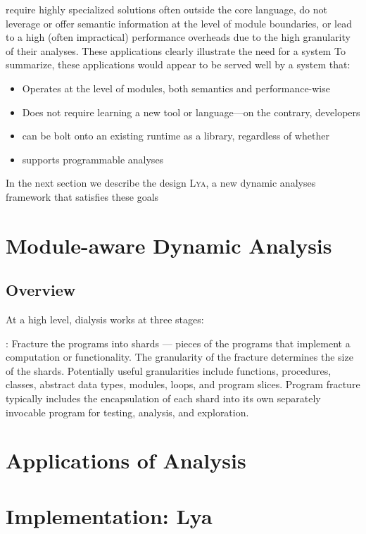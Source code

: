 \documentclass[letterpaper,twocolumn,10pt]{article}
\newcommand{\sys}{{\scshape Lya}\xspace}
\begin{document}
require highly specialized solutions often outside the core language,
do not leverage or offer semantic information at the level of module boundaries,
or lead to a high (often impractical) performance overheads due to the high granularity of their analyses.
These applications clearly illustrate the need for a system 
To summarize, these applications would appear to be served well by a system that:
\begin{itemize}
  \item Operates at the level of modules, both semantics and performance-wise
  \item Does not require learning a new tool or language---on the contrary,
    developers
  \item can be bolt onto an existing runtime as a library, regardless of whether 
  \item supports programmable analyses
\end{itemize}

In the next section we describe the design \sys, a new dynamic analyses
framework that satisfies these goals

\section{Module-aware Dynamic Analysis}
\label{design}

\subsection{Overview}

At a high level, dialysis works at three stages:

: Fracture the programs into shards — pieces
of the programs that implement a computation or functionality. The granularity of the fracture determines
the size of the shards. Potentially useful granularities
include functions, procedures, classes, abstract data
types, modules, loops, and program slices. Program
fracture typically includes the encapsulation of each
shard into its own separately invocable program for
testing, analysis, and exploration.


\section{Applications of Analysis}
\label{apps}


\section{Implementation: Lya}
\label{impl}
\end{document}
